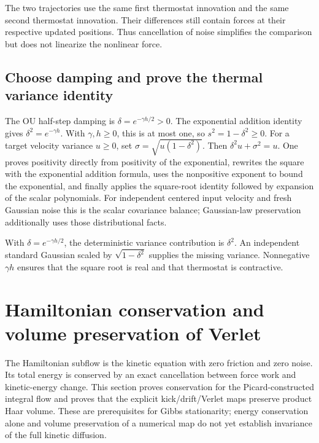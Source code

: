 \documentclass[11pt,a4paper]{report}
\begin{document}
The two trajectories use the same first thermostat innovation and the same second thermostat innovation. Their differences still contain forces at their respective updated positions. Thus cancellation of noise simplifies the comparison but does not linearize the nonlinear force.

\subsection{\texorpdfstring{Choose damping and prove the thermal variance identity}{Choose damping and prove the thermal variance identity}}
\label{report-step-KineticLangevin-OBABO-lean-5}


The OU half-step damping is \(\delta=e^{-\gamma h/2}>0\). The exponential addition identity gives \(\delta^2=e^{-\gamma h}\). With \(\gamma,h\ge0\), this is at most one, so \(s^2=1-\delta^2\ge0\). For a target velocity variance \(u\ge0\), set \(\sigma=\sqrt{u(1-\delta^2)}\). Then \(\delta^2u+\sigma^2=u\). One proves positivity directly from positivity of the exponential, rewrites the square with the exponential addition formula, uses the nonpositive exponent to bound the exponential, and finally applies the square-root identity followed by expansion of the scalar polynomials. For independent centered input velocity and fresh Gaussian noise this is the scalar covariance balance; Gaussian-law preservation additionally uses those distributional facts.



With \(\delta=e^{-\gamma h/2}\), the deterministic variance contribution is \(\delta^2\). An independent standard Gaussian scaled by \(\sqrt{1-\delta^2}\) supplies the missing variance. Nonnegative \(\gamma h\) ensures that the square root is real and that thermostat is contractive.

\section{\texorpdfstring{Hamiltonian conservation and volume preservation of Verlet}{Hamiltonian conservation and volume preservation of Verlet}}
\label{proof-module-KineticLangevin-Hamiltonian-lean}


The Hamiltonian subflow is the kinetic equation with zero friction and zero noise. Its total energy is conserved by an exact cancellation between force work and kinetic-energy change. This section proves conservation for the Picard-constructed integral flow and proves that the explicit kick/\allowbreak{}drift/\allowbreak{}Verlet maps preserve product Haar volume. These are prerequisites for Gibbs stationarity; energy conservation alone and volume preservation of a numerical map do not yet establish invariance of the full kinetic diffusion.
\end{document}
